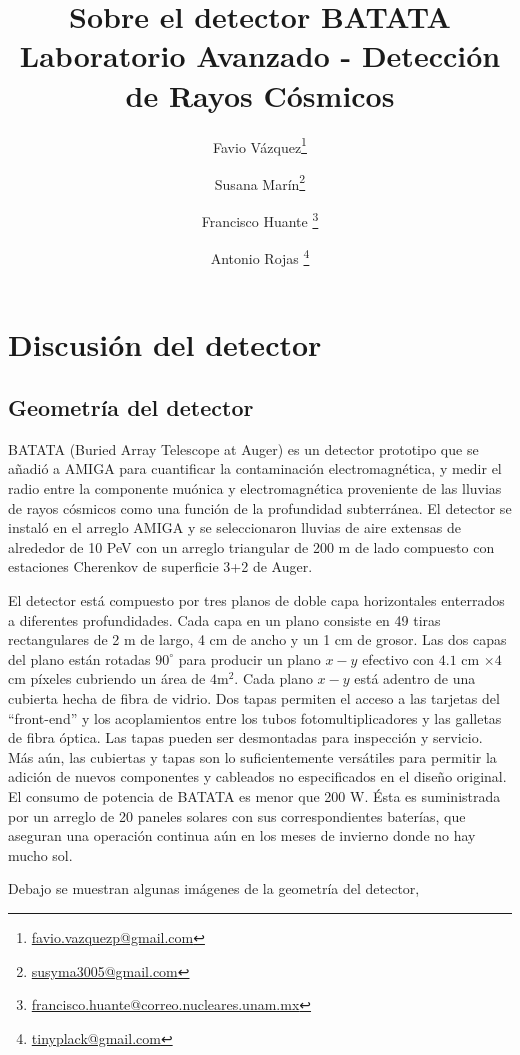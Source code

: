 \documentclass[a4paper,10pt]{article}
\title{{\huge Sobre el detector BATATA} \\
\vspace{.2cm}
\large Laboratorio Avanzado - Detección de Rayos Cósmicos}
\author[1]{Favio Vázquez\footnote{\url{favio.vazquezp@gmail.com}}}
\author[2]{Susana Marín\footnote{\url{susyma3005@gmail.com}}}
\author[1]{Francisco Huante \footnote{\url{francisco.huante@correo.nucleares.unam.mx}}}
\author[3]{Antonio Rojas \footnote{\url{tinyplack@gmail.com}}}
\affil[1]{Instituto de Ciencias Nucleares,
Universidad Nacional Autónoma de México}
\affil[2]{Instituto de Química,
Universidad Nacional Autónoma de México}
\affil[3]{Instituto de Física,
Universidad Nacional Autónoma de México}
\date{}
\numberwithin{equation}{section}
\begin{document}
\maketitle

\section{Discusión del detector}

\subsection{Geometría del detector}

BATATA (Buried Array Telescope at Auger) es un detector prototipo que se añadió 
a AMIGA para cuantificar la contaminación electromagnética, y medir el radio entre
la componente muónica y electromagnética proveniente de las lluvias de rayos cósmicos 
como una función de la profundidad subterránea. El detector se instaló en el 
arreglo AMIGA y se seleccionaron lluvias de aire extensas de alrededor de 10 PeV 
con un arreglo triangular de 200 m de lado compuesto con estaciones Cherenkov
de superficie 3+2 de Auger.

\vspace{.3cm}

El detector está compuesto por tres planos de doble capa horizontales enterrados 
a diferentes profundidades. Cada capa en un plano consiste en 49 tiras rectangulares 
de 2 m de largo, 4 cm de ancho y un 1 cm de grosor. Las dos capas del plano están 
rotadas $90^\circ$ para producir un plano $x-y$ efectivo con $4.1$ cm $\times 4$ cm 
píxeles cubriendo un área de $4$m$^2$. Cada plano $x-y$ está adentro de una cubierta 
hecha de fibra de vidrio. Dos tapas permiten el acceso a las tarjetas del ``front-end'' 
y los acoplamientos entre los tubos fotomultiplicadores y las galletas de fibra 
óptica. Las tapas pueden ser desmontadas para inspección y servicio. Más aún, las 
cubiertas y tapas son lo suficientemente versátiles para permitir la adición de 
nuevos componentes y cableados no especificados en el diseño original. El consumo 
de potencia de BATATA es menor que 200 W. Ésta es suministrada por un arreglo 
de 20 paneles solares con sus correspondientes baterías, que aseguran una operación 
continua aún en los meses de invierno donde no hay mucho sol. 

Debajo se muestran algunas imágenes de la geometría del detector,
\end{document}
